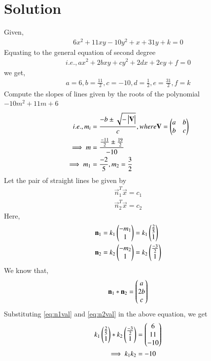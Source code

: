 \documentclass[journal,12pt,twocolumn]{IEEEtran}
\begin{document}
\section{Solution}
Given, 
\begin{align}
	6x^2 + 11xy - 10y^2 + x + 31y + k =0 \label{eq:eq5}
\end{align}
Equating to the general equation of second degree 
\begin{align}
	i.e.,  ax^2 + 2bxy + cy^2 + 2dx + 2ey + f = 0 \label{eq:geneq}
\end{align}
we get,
\begin{align}
	a = 6, b = \frac{11}{2}, c = -10, d = \frac{1}{2}, e = \frac{31}{2}, f = k
\end{align}
Compute the slopes of lines given by the roots of the polynomial $-10m^2 + 11m + 6$
\begin{align}
   i.e., m_i &= \frac{-b \pm \sqrt{- \begin{vmatrix}\mathbf{V}\end{vmatrix}}}{c},  where 
  \mathbf{V} = \begin{pmatrix}a & b\\b & c\end{pmatrix} \label{eq:eq2} \\
   \implies m &= \frac{\frac{-11}{2} \pm \frac{19}{2}}{-10} \\ 
   \implies m_1 &= \frac{-2}{5}, m_2 = \frac{3}{2} 
\end{align} 
Let the pair of straight lines be given by 
\begin{align}
	\vec{n}_1^T\vec{x} = c_1 \label{eq:n_1}\\
	\vec{n}_2^T\vec{x} = c_2 \label{eq:n_2}
\end{align}
Here,
\begin{align}
	\mathbf{n}_1 &= k_1\begin{pmatrix}-m_1\\1\end{pmatrix} = k_1 \begin{pmatrix} \frac{2}{5} \\ 1\end{pmatrix}  \label{eq:n1val}\\
	\mathbf{n}_2 &= k_2\begin{pmatrix}-m_2\\1\end{pmatrix} = k_2 \begin{pmatrix}\frac{-3}{2} \\ 1\end{pmatrix} \label{eq:n2val}
\end{align}
We know that, 
\begin{align}
	\mathbf{n}_1 * \mathbf{n}_2 = \begin{pmatrix}a\\2b\\c\end{pmatrix} \label{eq:n1n2}
\end{align}
Substituting \eqref{eq:n1val} and \eqref{eq:n2val} in the above equation, we get
\begin{align}
	k_1 \begin{pmatrix} \frac{2}{5} \\ 1\end{pmatrix} * k_2 \begin{pmatrix}\frac{-3}{2} \\ 1\end{pmatrix} &= \begin{pmatrix}6\\ 11\\ -10\end{pmatrix}\\
	\implies k_1k_2 &= -10
\end{align} 
\end{document}
